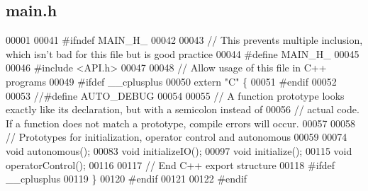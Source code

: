 \subsection{main.\+h}
\label{main_8h_source}

\begin{DoxyCode}
00001 
00041 \textcolor{preprocessor}{#ifndef MAIN\_H\_}
00042 
00043 \textcolor{comment}{// This prevents multiple inclusion, which isn't bad for this file but is good practice}
00044 \textcolor{preprocessor}{#define MAIN\_H\_}
00045 
00046 \textcolor{preprocessor}{#include <API.h>}
00047 
00048 \textcolor{comment}{// Allow usage of this file in C++ programs}
00049 \textcolor{preprocessor}{#ifdef \_\_cplusplus}
00050 \textcolor{keyword}{extern} \textcolor{stringliteral}{"C"} \{
00051 \textcolor{preprocessor}{#endif}
00052 
00053 \textcolor{comment}{//#define AUTO\_DEBUG}
00054 
00055 \textcolor{comment}{// A function prototype looks exactly like its declaration, but with a semicolon instead of}
00056 \textcolor{comment}{// actual code. If a function does not match a prototype, compile errors will occur.}
00057 
00058 \textcolor{comment}{// Prototypes for initialization, operator control and autonomous}
00059 
00074 \textcolor{keywordtype}{void} autonomous();
00083 \textcolor{keywordtype}{void} initializeIO();
00097 \textcolor{keywordtype}{void} initialize();
00115 \textcolor{keywordtype}{void} operatorControl();
00116 
00117 \textcolor{comment}{// End C++ export structure}
00118 \textcolor{preprocessor}{#ifdef \_\_cplusplus}
00119 \}
00120 \textcolor{preprocessor}{#endif}
00121 
00122 \textcolor{preprocessor}{#endif}
\end{DoxyCode}
